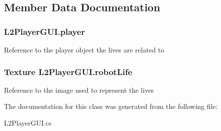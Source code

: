 \subsection{Member Data Documentation}
\hypertarget{class_l2_player_g_u_i_abafb0f674da5f4bae17845439ef20140}{
\subsubsection[{player}]{ L2\-Player\-G\-U\-I.\-player}}\label{class_l2_player_g_u_i_abafb0f674da5f4bae17845439ef20140}
Reference to the player object the lives are related to \hypertarget{class_l2_player_g_u_i_a9e2d8835c594cbc9521849c35ddde0dc}{
\subsubsection[{robot\-Life}]{\setlength{\rightskip}{0pt plus 5cm}Texture L2\-Player\-G\-U\-I.\-robot\-Life}}\label{class_l2_player_g_u_i_a9e2d8835c594cbc9521849c35ddde0dc}
Reference to the image used to represent the lives 

The documentation for this class was generated from the following file\-:\begin{DoxyCompactItemize}
\item 
L2\-Player\-G\-U\-I.\-cs\end{DoxyCompactItemize}
